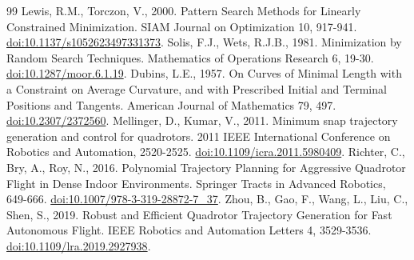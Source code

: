 \begin{thebibliography}{99}
 Lewis, R.M., Torczon, V., 2000. Pattern Search Methods for Linearly Constrained Minimization. SIAM Journal on Optimization 10, 917-941. \href{https://doi.org/10.1137/s1052623497331373}{doi:10.1137/s1052623497331373}.
 Solis, F.J., Wets, R.J.B., 1981. Minimization by Random Search Techniques. Mathematics of Operations Research 6, 19-30. \href{https://doi.org/10.1287/moor.6.1.19}{doi:10.1287/moor.6.1.19}.
 Dubins, L.E., 1957. On Curves of Minimal Length with a Constraint on Average Curvature, and with Prescribed Initial and Terminal Positions and Tangents. American Journal of Mathematics 79, 497. \href{https://doi.org/10.2307/2372560}{doi:10.2307/2372560}.
 Mellinger, D., Kumar, V., 2011. Minimum snap trajectory generation and control for quadrotors. 2011 IEEE International Conference on Robotics and Automation, 2520-2525. \href{https://doi.org/10.1109/icra.2011.5980409}{doi:10.1109/icra.2011.5980409}.
 Richter, C., Bry, A., Roy, N., 2016. Polynomial Trajectory Planning for Aggressive Quadrotor Flight in Dense Indoor Environments. Springer Tracts in Advanced Robotics, 649-666. \href{https://doi.org/10.1007/978-3-319-28872-7_37}{doi:10.1007/978-3-319-28872-7\_37}.
 Zhou, B., Gao, F., Wang, L., Liu, C., Shen, S., 2019. Robust and Efficient Quadrotor Trajectory Generation for Fast Autonomous Flight. IEEE Robotics and Automation Letters 4, 3529-3536. \href{https://doi.org/10.1109/lra.2019.2927938}{doi:10.1109/lra.2019.2927938}.
\end{thebibliography}
